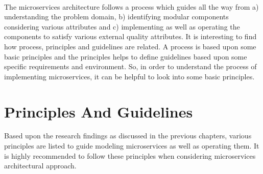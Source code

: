 \\
The microservices architecture follows a process which guides all the way from a) understanding the problem domain, b)  identifying modular components considering various attributes and c) implementing as well as operating the components to satisfy various external quality attributes. It is interesting to find how process, principles and guidelines are related. A process is based upon some basic principles and the principles helps to define guidelines based upon some specific requirements and environment. So, in order to understand the process of implementing microservices, it can be helpful to look into some basic principles.

\section{Principles And Guidelines}\label{section:guidelines/principles_and_guidelines}
Based upon the research findings as discussed in the previous chapters, various principles are listed to guide modeling microservices as well as operating them. It is highly recommended to follow these principles when considering microservices architectural approach.\cite{Newman:2015aa}
